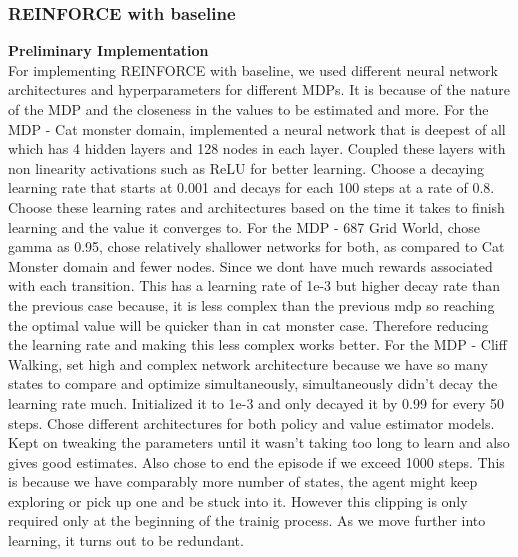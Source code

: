 \documentclass{article}
\begin{document}
\subsubsection{REINFORCE with baseline} 
\textbf{Preliminary Implementation}\\ 
For implementing REINFORCE with baseline, we used different neural network architectures and hyperparameters for different MDPs. It is because of the nature of the MDP and the closeness in the values to be estimated and more. 
For the MDP - Cat monster domain, implemented a neural network that is deepest of all which has 4 hidden layers and 128 nodes in each layer. Coupled these layers with non linearity activations such as ReLU for better learning. Choose a decaying learning rate that starts at 0.001 and decays for each 100 steps at a rate of 0.8. Choose these learning rates and architectures based on the time it takes to finish learning and the value it converges to. 
For the MDP - 687 Grid World, chose gamma as 0.95, chose relatively shallower networks for both, as compared to Cat Monster domain and fewer nodes. Since we dont have much rewards associated with each transition. This has a learning rate of 1e-3 but higher decay rate than the previous case because, it is less complex than the previous mdp so reaching the optimal value will be quicker than in cat monster case. Therefore reducing the learning rate and making this less complex works better. 
For the MDP - Cliff Walking, set high and complex network architecture because we have so many states to compare and optimize simultaneously, simultaneously didn't decay the learning rate much. Initialized it to 1e-3 and only decayed it by 0.99 for every 50 steps. Chose different architectures for both policy and value estimator models. Kept on tweaking the  parameters until it wasn't taking too long to learn and also gives good estimates. Also chose to end the episode if we exceed 1000 steps. This is because we have comparably more number of states, the agent might keep exploring or pick up one and be stuck into it. However this clipping is only required only at the beginning of the trainig process. As we move further into learning, it turns out to be redundant.
\end{document}

